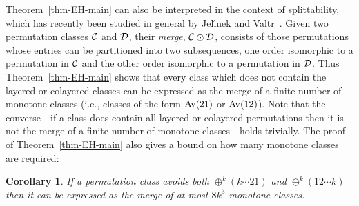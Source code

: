 \documentclass[
final
, nomarks
]{dmtcs-episciences}
\newtheorem{corollary}[theorem]{Corollary}
\begin{document}
Theorem~\ref{thm-EH-main} can also be interpreted in the context of splittability, which has recently been studied in general by Jel{\'{\i}}nek and Valtr~\cite{jelinek:splittings-and-:}. Given two permutation classes $\mathcal{C}$ and $\mathcal{D}$, their \emph{merge}, $\mathcal{C}\odot\mathcal{D}$, consists of those permutations whose entries can be partitioned into two subsequences, one order isomorphic to a permutation in $\mathcal{C}$ and the other order isomorphic to a permutation in $\mathcal{D}$. Thus Theorem~\ref{thm-EH-main} shows that every class which does not contain the layered or colayered classes can be expressed as the merge of a finite number of monotone classes (i.e., classes of the form $\operatorname{Av}(21)$ or $\operatorname{Av}(12)$). Note that the converse---if a class does contain all layered or colayered permutations then it is not the merge of a finite number of monotone classes---holds trivially. The proof of Theorem~\ref{thm-EH-main} also gives a bound on how many monotone classes are required:

\begin{corollary}
\label{cor-merge-mono}
If a permutation class avoids both $\oplus^k (k\cdots 21)$ and $\ominus^k (12\cdots k)$ then it can be expressed as the merge of at most $8k^3$ monotone classes.
\end{corollary}
\end{document}
